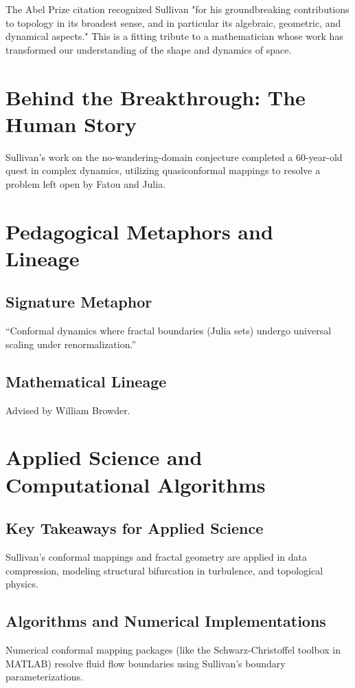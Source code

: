 The Abel Prize citation recognized Sullivan "for his groundbreaking contributions to topology in its broadest sense, and in particular its algebraic, geometric, and dynamical aspects." This is a fitting tribute to a mathematician whose work has transformed our understanding of the shape and dynamics of space.


\section{Behind the Breakthrough: The Human Story}
Sullivan's work on the no-wandering-domain conjecture completed a 60-year-old quest in complex dynamics, utilizing quasiconformal mappings to resolve a problem left open by Fatou and Julia.

\section{Pedagogical Metaphors and Lineage}
\subsection{Signature Metaphor}
``Conformal dynamics where fractal boundaries (Julia sets) undergo universal scaling under renormalization.''

\subsection{Mathematical Lineage}
Advised by William Browder.

\section{Applied Science and Computational Algorithms}
\subsection{Key Takeaways for Applied Science}
Sullivan's conformal mappings and fractal geometry are applied in data compression, modeling structural bifurcation in turbulence, and topological physics.

\subsection{Algorithms and Numerical Implementations}
Numerical conformal mapping packages (like the Schwarz-Christoffel toolbox in MATLAB) resolve fluid flow boundaries using Sullivan's boundary parameterizations.

